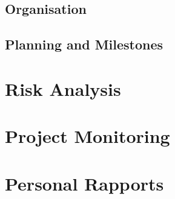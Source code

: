 \subsection{Organisation}

\subsection{Planning and Milestones}

\section{Risk Analysis}

\section{Project Monitoring}

\section{Personal Rapports}